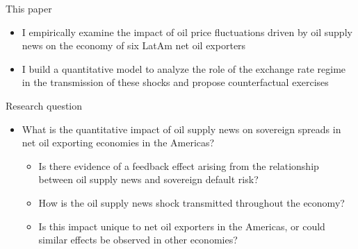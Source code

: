 \documentclass[compress,11pt,aspectratio=43]{beamer}
\begin{document}
\begin{frame}[label=This1]{This paper}
    \begin{itemize}
        \item I empirically examine the impact of oil price fluctuations driven by \alert{oil supply news} on the economy of six LatAm net oil exporters
        \item I build a quantitative model to analyze the role of the \alert{exchange rate regime} in the transmission of these shocks and propose counterfactual exercises
    \end{itemize}
\end{frame}
\begin{frame}[label=Question]{Research question}
\begin{itemize}
    \item What is the quantitative impact of oil supply news on sovereign spreads in net oil exporting economies in the Americas?
    \begin{itemize}
        \item Is there evidence of a feedback effect arising from the relationship between oil supply news and sovereign default risk?
        \item How is the oil supply news shock transmitted throughout the economy?
        \item Is this impact unique to net oil exporters in the Americas, or could similar effects be observed in other economies?
    \end{itemize}
\end{itemize}
\end{frame}
\end{document}

